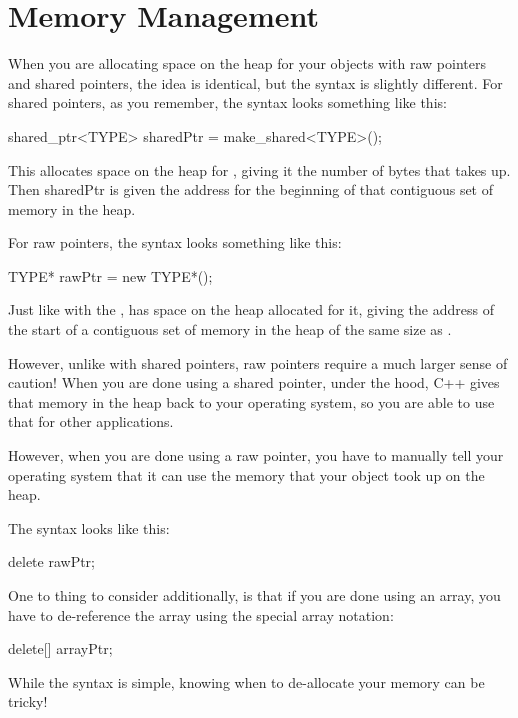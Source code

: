 \documentclass{tufte-handout}
\begin{document}
\section{Memory Management}
When you are allocating space on the heap for your objects with raw pointers and shared pointers, the idea is identical, but the syntax is slightly different.
For shared pointers, as you remember, the syntax looks something like this:
\begin{Code}
    shared_ptr<TYPE> sharedPtr = make_shared<TYPE>();
\end{Code}
This allocates space on the heap for , giving it the number of bytes that  takes up.
Then sharedPtr is given the address for the beginning of that contiguous set of memory in the heap.


For raw pointers, the syntax looks something like this:

\begin{Code}
    TYPE* rawPtr = new TYPE*();
\end{Code}
Just like with the ,  has space on the heap allocated for it, giving  the address of the start of a contiguous set of memory in the heap of the same size as .


However, unlike with shared pointers, raw pointers require a much larger sense of caution!
When you are done using a shared pointer, under the hood, C++ gives that memory in the heap back to your operating system, so you are able to use that for other applications. 

However, when you are done using a raw pointer, you have to manually tell your operating system that it can use the memory that your object took up on the heap.

The syntax looks like this:

\begin{Code}
    delete rawPtr;
\end{Code}

One to thing to consider additionally, is that if you are done using an array, you have to de-reference the array using the special array notation:

\begin{Code}
    delete[] arrayPtr;
\end{Code}


While the syntax is simple, knowing when to de-allocate your memory can be tricky!
\end{document}
